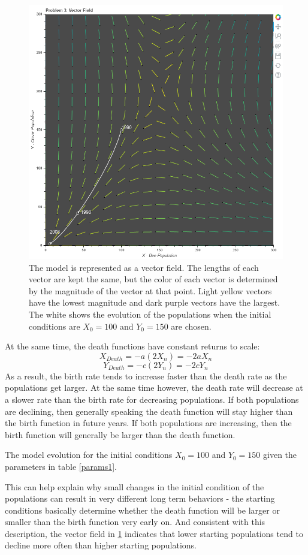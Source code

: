 \documentclass[12pt,a4paper,titlepage]{report}
\begin{document}
		\begin{figure}[htbp]
			\centerline{\includegraphics[scale=.5]{charts/problem3_chart.png}}
			\caption{The model is represented as a vector field. The lengths of each vector are kept the same, but the color of each vector is determined by the magnitude of the vector at that point. Light yellow vectors have the lowest magnitude and dark purple vectors have the largest. The white shows the evolution of the populations when the initial conditions are \(X_{0} = 100\) and \(Y_{0} = 150\) are chosen.}
			\label{fig:p3}
		\end{figure}
		At the same time, the death functions have constant returns to scale:
		\[X_{Death} = -a (2X_{n}) = -2aX_{n}\]
		\[Y_{Death} = -c (2Y_{n}) = -2cY_{n}\]
		As a result, the birth rate tends to increase faster than the death rate as the populations get larger. At the same time however, the death rate will decrease at a slower rate than the birth rate for decreasing populations. If both populations are declining, then generally speaking the death function will stay higher than the birth function in future years. If both populations are increasing, then the birth function will generally be larger than the death function. 
		\begin{table} 
			\centering
			
			\caption{The model evolution for the initial conditions \(X_{0} = 100\) and \(Y_{0} = 150\) given the parameters in table \ref{params1}.}
			\label{tab:p3}
		\end{table}
		This can help explain why small changes in the initial condition of the populations can result in very different long term behaviors - the starting conditions basically determine whether the death function will be larger or smaller than the birth function very early on. And consistent with this description, the vector field in \ref{fig:p3} indicates that lower starting populations tend to decline more often than higher starting populations. 
		
\end{document}
